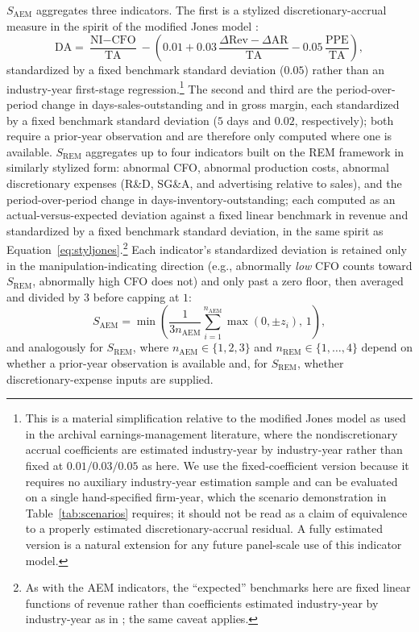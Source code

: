 \documentclass[12pt]{article}
\begin{document}
$S_{\text{AEM}}$ aggregates three indicators.  The first is a
stylized discretionary-accrual measure in the spirit of the modified
Jones model \citep{dechow1995}:
\begin{equation}
    \text{DA} = \frac{\text{NI}-\text{CFO}}{\text{TA}}
    - \left(0.01 + 0.03\,\frac{\Delta\text{Rev}-\Delta\text{AR}}{\text{TA}}
    - 0.05\,\frac{\text{PPE}}{\text{TA}}\right),
    \label{eq:styljones}
\end{equation}
standardized by a fixed benchmark standard deviation ($0.05$) rather than
an industry-year first-stage regression.\footnote{This is a material
simplification relative to the modified Jones model as used in the
archival earnings-management literature, where the nondiscretionary
accrual coefficients are estimated industry-year by industry-year rather
than fixed at $0.01/0.03/0.05$ as here.  We use the fixed-coefficient
version because it requires no auxiliary industry-year estimation sample
and can be evaluated on a single hand-specified firm-year, which the
scenario demonstration in Table~\ref{tab:scenarios} requires; it should
not be read as a claim of equivalence to a properly estimated
discretionary-accrual residual.  A fully estimated version is a natural
extension for any future panel-scale use of this indicator model.} The
second and third are the period-over-period change in days-sales-outstanding
and in gross margin, each standardized by a fixed benchmark standard
deviation ($5$ days and $0.02$, respectively); both require a prior-year
observation and are therefore only computed where one is available.
$S_{\text{REM}}$ aggregates up to four indicators built on the
\citet{roychowdhury2006} REM framework in similarly stylized
form: abnormal CFO, abnormal production costs, abnormal discretionary
expenses (R\&D, SG\&A, and advertising relative to sales), and the
period-over-period change in days-inventory-outstanding; each computed
as an actual-versus-expected deviation against a fixed linear benchmark
in revenue and standardized by a fixed benchmark standard deviation, in
the same spirit as Equation~\eqref{eq:styljones}.\footnote{As with the
AEM indicators, the ``expected'' benchmarks here are fixed linear
functions of revenue rather than coefficients estimated industry-year by
industry-year as in \citet{roychowdhury2006}; the same caveat applies.}
Each indicator's standardized deviation is retained only in the
manipulation-indicating direction (e.g., abnormally \emph{low} CFO
counts toward $S_{\text{REM}}$, abnormally high CFO does not) and only
past a zero floor, then averaged and divided by $3$ before capping at
$1$:
\begin{equation}
    S_{\text{AEM}} = \min\!\left(\frac{1}{3n_{\text{AEM}}}\sum_{i=1}^{n_{\text{AEM}}}\max(0,\pm z_i),\,1\right),
\end{equation}
and analogously for $S_{\text{REM}}$, where $n_{\text{AEM}} \in \{1,2,3\}$
and $n_{\text{REM}} \in \{1,\dots,4\}$ depend on whether a prior-year
observation is available and, for $S_{\text{REM}}$, whether discretionary-expense
inputs are supplied.
\end{document}
